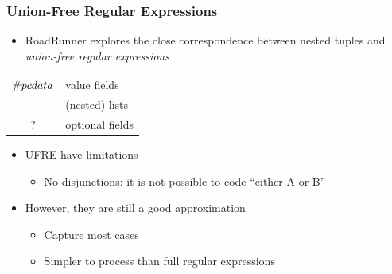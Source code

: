 \documentclass[svgnames]{beamer}
\begin{document}


\begin{frame}
    \frametitle{Union-Free Regular Expressions}
    
    \begin{itemize}
    \item<+-> RoadRunner explores the close correspondence between nested tuples
        and \emph{union-free regular expressions}
    \end{itemize}
      \begin{center}
          \begin{tabular}{c@{~~$\Rightarrow$~~}l}
              $\#pcdata$ & value fields \\
              $+$ & (nested) lists \\
              $?$ & optional fields
          \end{tabular}
      \end{center}
    \begin{itemize}
    \item UFRE have limitations
        \begin{itemize}
        \item No disjunctions: it is not possible to code ``either A or B''
        \end{itemize}
    \item However, they are still a good approximation
        \begin{itemize}
        \item Capture most cases
        \item Simpler to process than full regular expressions
        \end{itemize}
    \end{itemize}
\end{frame}


    
\end{document}
